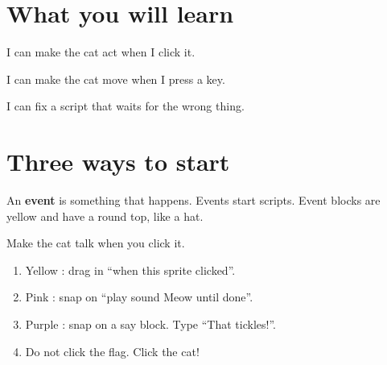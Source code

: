 
\section{What you will learn}
\begin{ican}
  \item I can make the cat act when I click it.
  \item I can make the cat move when I press a key.
  \item I can fix a script that waits for the wrong thing.
\end{ican}

\section{Three ways to start}
An \textbf{event} is something that happens. Events start scripts. Event blocks are yellow and have a round top, like a hat.

\begin{exercise}
Make the cat talk when you click it.
\begin{enumerate}[leftmargin=1.4em,itemsep=2pt]
  \item Yellow : drag in \enquote{when this sprite clicked}.
  \item Pink : snap on \enquote{play sound Meow until done}.
  \item Purple : snap on a say block. Type \enquote{That tickles!}.
  \item Do not click the flag. Click the cat!
\end{enumerate}
\begin{center}
\begin{scratch}[scale=0.9]
\end{scratch}
\end{center}
\end{exercise}

